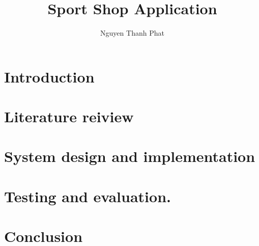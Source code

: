 \documentclass[a4paper,12pt,oneside]{report}
\title{Sport Shop Application}
\author{Nguyen Thanh Phat}
\begin{document}



\tableofcontents
\listoffigures
\listoftables






\clearpage
{}
\chapter{Introduction}


\chapter{Literature reiview}


% 

\chapter{System design and implementation}


\chapter{Testing and evaluation.}


\chapter{Conclusion}


{}

\end{document}
